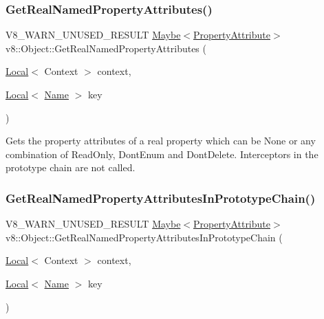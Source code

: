 \subsubsection{\texorpdfstring{Get\+Real\+Named\+Property\+Attributes()}{GetRealNamedPropertyAttributes()}}
{\footnotesize\ttfamily V8\+\_\+\+W\+A\+R\+N\+\_\+\+U\+N\+U\+S\+E\+D\+\_\+\+R\+E\+S\+U\+LT \mbox{\hyperlink{classv8_1_1Maybe}{Maybe}}$<$\mbox{\hyperlink{namespacev8_a05f25f935e108a1ea2d150e274602b87}{Property\+Attribute}}$>$ v8\+::\+Object\+::\+Get\+Real\+Named\+Property\+Attributes (\begin{DoxyParamCaption}\item[{\mbox{\hyperlink{classv8_1_1Local}{Local}}$<$ Context $>$}]{context,  }\item[{\mbox{\hyperlink{classv8_1_1Local}{Local}}$<$ \mbox{\hyperlink{classv8_1_1Name}{Name}} $>$}]{key }\end{DoxyParamCaption})}

Gets the property attributes of a real property which can be None or any combination of Read\+Only, Dont\+Enum and Dont\+Delete. Interceptors in the prototype chain are not called. \mbox{\label{classv8_1_1Object_aab7c2e5c5659e95e97488e01b04bf3c8}} 
\subsubsection{\texorpdfstring{Get\+Real\+Named\+Property\+Attributes\+In\+Prototype\+Chain()}{GetRealNamedPropertyAttributesInPrototypeChain()}}
{\footnotesize\ttfamily V8\+\_\+\+W\+A\+R\+N\+\_\+\+U\+N\+U\+S\+E\+D\+\_\+\+R\+E\+S\+U\+LT \mbox{\hyperlink{classv8_1_1Maybe}{Maybe}}$<$\mbox{\hyperlink{namespacev8_a05f25f935e108a1ea2d150e274602b87}{Property\+Attribute}}$>$ v8\+::\+Object\+::\+Get\+Real\+Named\+Property\+Attributes\+In\+Prototype\+Chain (\begin{DoxyParamCaption}\item[{\mbox{\hyperlink{classv8_1_1Local}{Local}}$<$ Context $>$}]{context,  }\item[{\mbox{\hyperlink{classv8_1_1Local}{Local}}$<$ \mbox{\hyperlink{classv8_1_1Name}{Name}} $>$}]{key }\end{DoxyParamCaption})}


